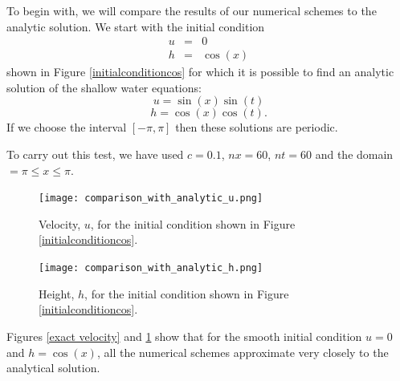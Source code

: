 \documentclass[a4paper,12pt, notitlepage]{article}
\begin{document}
To begin with, we will compare the results of our numerical schemes to the analytic solution.
We start with the initial condition 
\begin{eqnarray}
u  & =  & 0 \\
h & = &  \cos(x)
\end{eqnarray}
shown in Figure \ref{initialconditioncos} for which it is possible to find an analytic solution of the shallow water equations:
\begin{equation}\label{uanalytic}
u = \sin(x)\sin(t)
\end{equation}
\begin{equation}\label{hanalytic}
h = \cos(x)\cos(t).
\end{equation}
If we choose the interval $[-\pi, \pi]$ then these solutions are periodic.

To carry out this test, we have used $c = 0.1$, $nx = 60$, $nt = 60$ and the domain $=\pi\leq x \leq \pi$.
\renewcommand\theContinuedFloat{\alph{ContinuedFloat}}
\begin{figure} [H]
	\begin{minipage}{.5\textwidth}
		\ContinuedFloat*
		\captionsetup{width=0.9\textwidth}
		\captionsetup{justification=centering}
		\texttt{[image: comparison\_with\_analytic\_u.png]}
		\caption{\label{exact velocity} Velocity, $u$, for the initial condition shown in Figure \ref{initialconditioncos}. } 
	\end{minipage}
	\begin{minipage}{.5\textwidth}
		\ContinuedFloat
		\captionsetup{width=0.9\textwidth}
		\captionsetup{justification=centering}
		\texttt{[image: comparison\_with\_analytic\_h.png]}
		\caption{\label{exact height} Height, $h$, for the initial condition shown in Figure \ref{initialconditioncos}.} 
	\end{minipage}
\end{figure}
Figures \ref{exact velocity} and \ref{exact height} show that for the smooth initial condition $u= 0$ and $h= \cos(x)$, all the numerical schemes approximate very closely to the analytical solution. 

\end{document}
